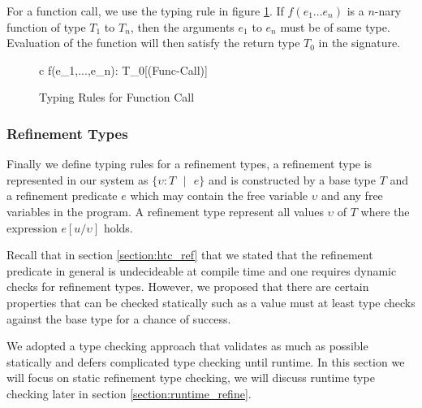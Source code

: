 \documentclass[a4paper,12pt]{report}
\begin{document}
\par
For a function call, we use the typing rule in figure \ref{fig:type_check_f_call}. 
If $f(e_1...e_n)$ is a $n$-nary function of type $T_1$ to $T_n$, 
then the arguments $e_1$ to $e_n$ must be of same type. 
Evaluation of the function will then satisfy the return type $T_0$ in the signature. 

\begin{figure}[H]
  \begin{center}
    \begin{tabular} {c}
        {\Gamma \vdash f(e_1,\text{ }...\text{ },e_n): T_0}[(Func-Call)]
    \end{tabular}
  \end{center}
  \caption{Typing Rules for Function Call}
  \label{fig:type_check_f_call}
\end{figure}

\subsubsection{Refinement Types} \label{section:ref_type_check}
Finally we define typing rules for a refinement types, a refinement type 
is represented in our system as $\{\upsilon : T\text{ }|\text{ }e\}$ and is 
constructed by a base type $T$ and a refinement predicate $e$ which may contain 
the free variable $\upsilon$ and any free variables in the program. A refinement 
type represent all values $\upsilon$ of $T$ where the expression $e[u/\upsilon]$ holds. 

\par
Recall that in section \ref{section:htc_ref} that we stated that the refinement 
predicate in general is undecideable at compile time and one requires dynamic 
checks for refinement types. However, we proposed that there are certain 
properties that can be checked statically such as a value must at least 
type checks against the base type for a chance of success. 

\par
We adopted a type checking approach that validates as much as possible 
statically and defers complicated type 
checking until runtime. In this section we will focus on static refinement type 
checking, we will discuss runtime type checking later in section 
\ref{section:runtime_refine}.
\end{document}
